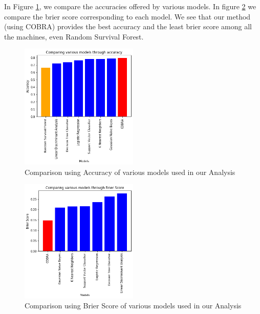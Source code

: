 \documentclass[13pt]{article}
\begin{document}
In Figure \ref{fig:acc_comp}, we compare the accuracies offered by various models. In figure \ref{fig:brier} we compare the brier score corresponding to each model. We see that our method (using COBRA) provides the best accuracy and the least brier score among all the machines, even Random Survival Forest. 

\begin{figure}[h!]
    \centering
    \includegraphics[width = 0.5\textwidth]{images/acc_comp.png}
    \caption{Comparison using Accuracy of various models used in our Analysis}
    \label{fig:acc_comp}
\end{figure}

\begin{figure}[h!]
    \centering
    \includegraphics[width = 0.5\textwidth]{images/brier_score.png}
    \caption{Comparison using Brier Score of various models used in our Analysis}
    \label{fig:brier}
\end{figure}

\pagebreak
\clearpage
\nocite{*}


\end{document}
